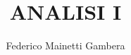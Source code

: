 \title{ANALISI I}
\author{Federico Mainetti Gambera}
\usepackage{amsmath}
\usepackage{amssymb}
\usepackage{graphicx}
\usepackage[italian]{babel}
\usepackage{import}
\usepackage{xifthen}
\usepackage{pdfpages}
\usepackage{transparent}
\usepackage{xcolor}
\usepackage{verbatim}
\usepackage[a4paper,left=35mm,top=26mm,right=26mm,bottom=15mm]{geometry}

\renewcommand{\familydefault}{\sfdefault}

\newcommand{\incfig}[1]{%
    \def\svgwidth{\columnwidth}
    {#1.pdf_tex}
}